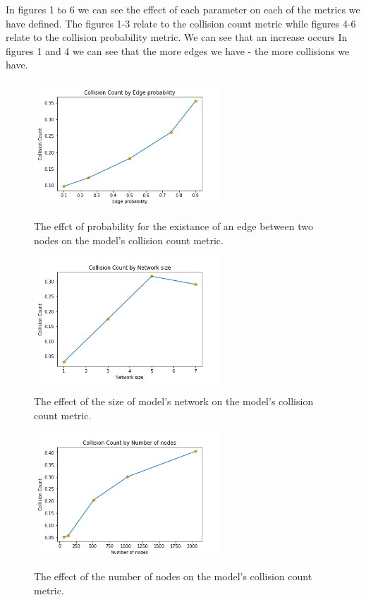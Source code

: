 \documentclass{article}
\begin{document}
In figures 1 to 6 we can see the effect of each parameter on each of the metrics we have defined.
The figures 1-3 relate to the collision count metric while figures 4-6 relate to the collision probability metric.
We can see that an increase occurs In figures 1 and 4 we can see that the more edges we have - the more collisions we have.
\begin{figure}
    \begin{center}
        \includegraphics[width=7cm]{../figures/Collision_Count_edge_prob.png}\\
        \caption{The effct of probability for the existance of an edge between two nodes on the model's collision count metric.}
    \end{center}
\end{figure}    
\begin{figure}
    \begin{center}
        \includegraphics[width=7cm]{../figures/Collision_Count_network_size.png}\\
        \caption{The effect of the size of model's network on the model's collision count metric.}
    \end{center}
\end{figure}    
\begin{figure}
    \begin{center}
        \includegraphics[width=7cm]{../figures/Collision_Count_num_nodes.png}\\
        \caption{The effect of the number of nodes on the model's collision count metric.}
    \end{center}
\end{figure}    
\end{document}

